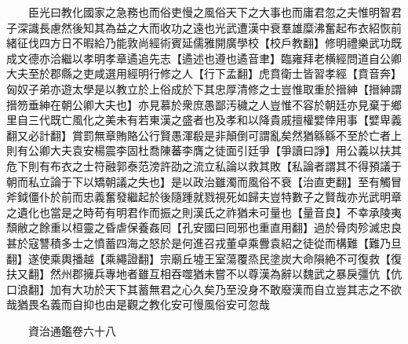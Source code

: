 　　臣光曰教化國家之急務也而俗吏慢之風俗天下之大事也而庸君忽之夫惟明智君子深識長慮然後知其為益之大而收功之遠也光武遭漢中衰羣雄糜沸奮起布衣紹恢前緒征伐四方日不暇給乃能敦尚經術賓延儒雅開廣學校【校戶教翻】修明禮樂武功既成文德亦洽繼以孝明孝章遹追先志【遹述也遵也遹音聿】臨雍拜老横經問道自公卿大夫至於郡縣之吏咸選用經明行修之人【行下孟翻】虎賁衛士皆習孝經【賁音奔】匈奴子弟亦遊太學是以教立於上俗成於下其忠厚清修之士豈惟取重於搢紳【搢紳謂搢笏垂紳在朝公卿大夫也】亦見慕於衆庶愚鄙汚穢之人豈惟不容於朝廷亦見棄于鄉里自三代既亡風化之美未有若東漢之盛者也及孝和以降貴戚擅權嬖倖用事【嬖卑義翻又必計翻】賞罰無章賄賂公行賢愚渾殽是非顛倒可謂亂矣然猶緜緜不至於亡者上則有公卿大夫袁安楊震李固杜喬陳蕃李膺之徒面引廷爭【爭讀曰諍】用公義以扶其危下則有布衣之士符融郭泰范滂許劭之流立私論以救其敗【私論者謂其不得預議于朝而私立論于下以矯朝議之失也】是以政治雖濁而風俗不衰【治直吏翻】至有觸冒斧鉞僵仆於前而忠義奮發繼起於後隨踵就戮視死如歸夫豈特數子之賢哉亦光武明章之遺化也當是之時苟有明君作而振之則漢氏之祚猶未可量也【量音良】不幸承陵夷頹敝之餘重以桓靈之昏虐保養姦囘【孔安國曰囘邪也重直用翻】過於骨肉殄滅忠良甚於寇讐積多士之憤蓄四海之怒於是何進召戎董卓乘釁袁紹之徒從而構難【難乃旦翻】遂使乘輿播越【乘繩證翻】宗廟丘墟王室蕩覆烝民塗炭大命隕絶不可復救【復扶又翻】然州郡擁兵專地者雖互相吞噬猶未嘗不以尊漢為辭以魏武之暴戾彊伉【伉口浪翻】加有大功於天下其蓄無君之心久矣乃至没身不敢廢漢而自立豈其志之不欲哉猶畏名義而自抑也由是觀之教化安可慢風俗安可忽哉

　　資治通鑑卷六十八  
    


 


 



 

 
  







 


　　
　　
　
　
　


　　

　















	
	









































